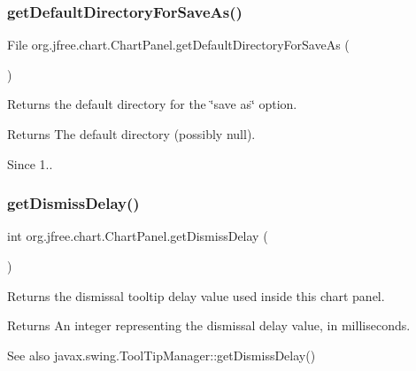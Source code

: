 \subsubsection{\texorpdfstring{get\+Default\+Directory\+For\+Save\+As()}{getDefaultDirectoryForSaveAs()}}
{\footnotesize\ttfamily File org.\+jfree.\+chart.\+Chart\+Panel.\+get\+Default\+Directory\+For\+Save\+As (\begin{DoxyParamCaption}{ }\end{DoxyParamCaption})}

Returns the default directory for the \char`\"{}save as\char`\"{} option.

\begin{DoxyReturn}{Returns}
The default directory (possibly {\ttfamily null}).
\end{DoxyReturn}
\begin{DoxySince}{Since}
1.. 
\end{DoxySince}
\mbox{\label{classorg_1_1jfree_1_1chart_1_1_chart_panel_a994388195453a476f332416e6966b1c9}} 
\subsubsection{\texorpdfstring{get\+Dismiss\+Delay()}{getDismissDelay()}}
{\footnotesize\ttfamily int org.\+jfree.\+chart.\+Chart\+Panel.\+get\+Dismiss\+Delay (\begin{DoxyParamCaption}{ }\end{DoxyParamCaption})}

Returns the dismissal tooltip delay value used inside this chart panel.

\begin{DoxyReturn}{Returns}
An integer representing the dismissal delay value, in milliseconds.
\end{DoxyReturn}
\begin{DoxySeeAlso}{See also}
javax.\+swing.\+Tool\+Tip\+Manager\+::get\+Dismiss\+Delay() 
\end{DoxySeeAlso}
\mbox{\label{classorg_1_1jfree_1_1chart_1_1_chart_panel_a886392b2f12e5da06f91680f7d521aa7}} 
